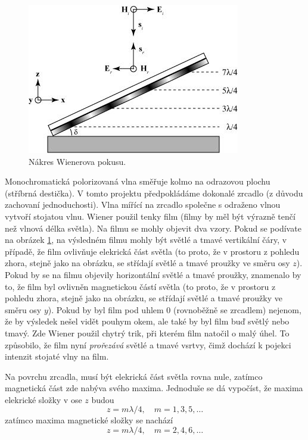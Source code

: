 \documentclass[12pt,a4paper,titlepage,final]{report}
\begin{document}
\begin{figure}[!htb]
   \centering
 	\includegraphics{energy_fig_wiener}
   \caption{Nákres Wienerova pokusu.}
   \label{fig:energy_fig_wiener}
\end{figure}

Monochromatická polorizovaná vlna směřuje kolmo na odrazovou plochu (stříbrná destička). V tomto
projektu předpokládáme dokonalé zrcadlo (z důvodu zachovaní jednoduchosti). Vlna mířící na zrcadlo společne s odraženo vlnou
vytvoří stojatou vlnu. Wiener použil tenky film (filmy by měl být výrazně tenčí než vlnová délka světla). 
Na filmu se mohly objevit dva vzory. Pokud se podívate na obrázek \ref{fig:energy_fig_wiener}, na výsledném filmu mohly být světlé a tmavé vertikální čáry, v případě, že film ovlivňuje elekrická část světla (to proto, že v prostoru z pohledu zhora, stejně jako na obrázku, se střídají světlé a tmavé proužky ve směru osy $z$). Pokud by se na filmu objevily 
horizontální světlé a tmavé proužky, znamenalo by to, že film byl ovlivněn magnetickou částí světla (to proto, že v prostoru z pohledu zhora, stejně jako na obrázku, se střídají světlé a tmavé proužky ve směru osy $y$). Pokud by byl film pod uhlem 0 (rovnoběžně se zrcadlem) nejenom, že by výsledek nešel vidět pouhym okem, ale také by byl film buď světlý nebo tmavý. Zde Wiener použil chytrý trik, při kterém film natočil o malý úhel. To způsobilo, že film nyní \emph{prořezává} světlé a tmavé vsrtvy, čimž dochází k pojekci intenzit stojaté vlny na film.

Na povrchu zrcadla, musí být elekrická část světla rovna nule, zatímco magnetická část zde nabýva svého maxima. Jednoduše se dá 
vypočíst, že maxima elekrické složky v ose $z$ budou
\begin{equation}
z = m\lambda / 4, \quad m=1,3,5,\ldots
\end{equation}
zatímco maxima magnetické složky se nachází
\begin{equation}
z = m\lambda / 4, \quad m=2,4,6,\ldots
\end{equation}
\end{document}
